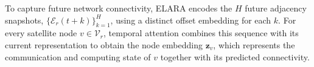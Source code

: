 \documentclass[10pt, conference, letterpaper]{IEEEtran}
\begin{document}

To capture future network connectivity, ELARA encodes the $H$ future adjacency snapshots, $\{\mathcal E_r(t+k)\}_{k=1}^{H}$, using a distinct offset embedding for each $k$. For every satellite node $v\in\mathcal V_r$, temporal attention combines this sequence with its current representation to obtain the node embedding $\mathbf z_v$, which represents the communication and computing state of $v$ together with its predicted connectivity.
\end{document}
